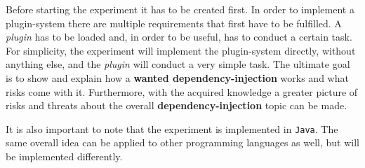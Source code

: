 Before starting the experiment it has to be created first.
In order to implement a plugin-system there are multiple requirements that first have to be fulfilled.
A \textit{plugin} has to be loaded and, in order to be useful, has to conduct a certain task.
For simplicity, the experiment will implement the plugin-system directly, without anything else, and the \textit{plugin} will conduct a very simple task.
The ultimate goal is to show and explain how a \textbf{wanted dependency-injection} works and what risks come with it.
Furthermore, with the acquired knowledge a greater picture of risks and threats about the overall \textbf{dependency-injection} topic can be made.

It is also important to note that the experiment is implemented in \texttt{Java}.
The same overall idea can be applied to other programming languages as well, but will be implemented differently.


